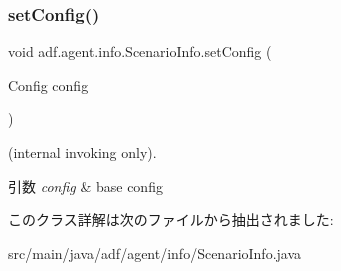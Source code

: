 \subsubsection{\texorpdfstring{set\+Config()}{setConfig()}}
{\footnotesize\ttfamily void adf.\+agent.\+info.\+Scenario\+Info.\+set\+Config (\begin{DoxyParamCaption}\item[{Config}]{config }\end{DoxyParamCaption})}



(internal invoking only). 


\begin{DoxyParams}{引数}
{\em config} & base config \\
\hline
\end{DoxyParams}


このクラス詳解は次のファイルから抽出されました\+:\begin{DoxyCompactItemize}
\item 
src/main/java/adf/agent/info/Scenario\+Info.\+java\end{DoxyCompactItemize}
